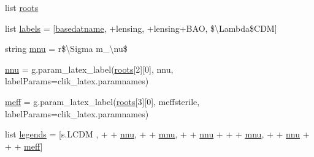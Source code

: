 \begin{DoxyCompactItemize}
\item 
list \mbox{\hyperlink{namespacesigma8__omegam__H0__neutrinos_ad26beb5cf572c1b26f7674dddcd76a78}{roots}}
\item 
list \mbox{\hyperlink{namespacesigma8__omegam__H0__neutrinos_a7eb18f68c4db9d4ab50b32dcabd93d7a}{labels}} = \mbox{[}\mbox{\hyperlink{namespacesigma8__omegam__H0__neutrinos_ab81a53ce65e14fbd7fcebc8255bb9e24}{basedatname}}, \textquotesingle{}+lensing\textquotesingle{}, \textquotesingle{}+lensing+B\+AO\textquotesingle{}, \textquotesingle{}\$\textbackslash{}Lambda\$\+C\+DM\textquotesingle{}\mbox{]}
\item 
string \mbox{\hyperlink{namespacesigma8__omegam__H0__neutrinos_af5508f23be264b167a81bc0ded5fef41}{mnu}} = r\textquotesingle{}\$\textbackslash{}Sigma m\+\_\+\textbackslash{}nu\$\textquotesingle{}
\item 
\mbox{\hyperlink{namespacesigma8__omegam__H0__neutrinos_acb935efeda9daade15f08c15a961ef21}{nnu}} = g.\+param\+\_\+latex\+\_\+label(\mbox{\hyperlink{namespacesigma8__omegam__H0__neutrinos_ad26beb5cf572c1b26f7674dddcd76a78}{roots}}\mbox{[}2\mbox{]}\mbox{[}0\mbox{]}, \textquotesingle{}nnu\textquotesingle{}, label\+Params=\textquotesingle{}clik\+\_\+latex.\+paramnames\textquotesingle{})
\item 
\mbox{\hyperlink{namespacesigma8__omegam__H0__neutrinos_a6143ce5b5f4d1e4aeb72af0e1d0c1fff}{meff}} = g.\+param\+\_\+latex\+\_\+label(\mbox{\hyperlink{namespacesigma8__omegam__H0__neutrinos_ad26beb5cf572c1b26f7674dddcd76a78}{roots}}\mbox{[}3\mbox{]}\mbox{[}0\mbox{]}, \textquotesingle{}meffsterile\textquotesingle{}, label\+Params=\textquotesingle{}clik\+\_\+latex.\+paramnames\textquotesingle{})
\item 
list \mbox{\hyperlink{namespacesigma8__omegam__H0__neutrinos_aea361e871a0ef6fe21cd7907ba18a4e9}{legends}} = \mbox{[}s.\+L\+C\+DM , \textquotesingle{}+\textquotesingle{} + \mbox{\hyperlink{namespacesigma8__omegam__H0__neutrinos_acb935efeda9daade15f08c15a961ef21}{nnu}}, \textquotesingle{}+\textquotesingle{} + \mbox{\hyperlink{namespacesigma8__omegam__H0__neutrinos_af5508f23be264b167a81bc0ded5fef41}{mnu}}, \textquotesingle{}+\textquotesingle{} + \mbox{\hyperlink{namespacesigma8__omegam__H0__neutrinos_acb935efeda9daade15f08c15a961ef21}{nnu}} + \textquotesingle{}+\textquotesingle{} + \mbox{\hyperlink{namespacesigma8__omegam__H0__neutrinos_af5508f23be264b167a81bc0ded5fef41}{mnu}}, \textquotesingle{}+\textquotesingle{} + \mbox{\hyperlink{namespacesigma8__omegam__H0__neutrinos_acb935efeda9daade15f08c15a961ef21}{nnu}} + \textquotesingle{}+\textquotesingle{} + \mbox{\hyperlink{namespacesigma8__omegam__H0__neutrinos_a6143ce5b5f4d1e4aeb72af0e1d0c1fff}{meff}}\mbox{]}

\end{DoxyCompactItemize}

